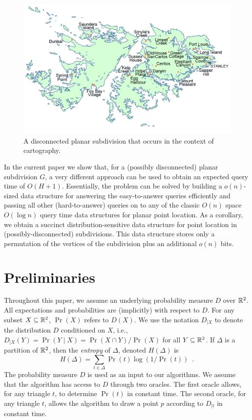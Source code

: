 \documentclass{patmorin}
\begin{document}
\begin{figure}
  \begin{center}\includegraphics[width=5in]{falklands}\end{center}
  \caption{A disconnected planar subdivision that occurs in the context of
cartography.}
\end{figure}

In the current paper we show that, for a (possibly disconnected)
planar subdivision $G$, a very different approach can be used to obtain
an expected query time of $O(H+1)$. Essentially, the problem can be
solved by building a $o(n)$-sized data structure for answering the
easy-to-answer queries efficiently and passing all other (hard-to-answer)
queries on to any of the classic $O(n)$ space $O(\log n)$ query time
data structures for planar point location. As a corollary, we obtain
a succinct distribution-sensitive data structure for point location in
(possibly-disconnected) subdivisions.  This data structure stores only
a permutation of the vertices of the subdivision plus an additional
$o(n)$ bits.

\section{Preliminaries}

Throughout this paper, we assume an underlying probability measure
$D$ over $\mathbb{R}^2$.  All expectations and probabilities are (implicitly)
with respect to $D$.  For any subset $X\subseteq\mathbb{R}^2$, $\Pr(X)$ refers
to $D(X)$.  We use the notation $D_{|X}$ to denote the distribution $D$
conditioned on $X$, i.e., $D_{|X}(Y)=\Pr(Y\mid X)=\Pr(X\cap Y)/\Pr(X)$
for all $Y\subseteq\mathbb{R}^2$.  If $\Delta$ is a partition of $\mathbb{R}^2$, then
the \emph{entropy} of $\Delta$, denoted $H(\Delta)$ is
\[
    H(\Delta) = \sum_{t\in \Delta} \Pr(t)\log(1/\Pr(t)) \enspace .
\]
The probability measure $D$ is used as an input to our algorithms.
We assume that the algorithm has access to $D$ through two oracles.
The first oracle allows, for any triangle $t$, to determine $\Pr(t)$
in constant time.  The second oracle, for any triangle $t$, allows the
algorithm to draw a point $p$ according to $D_{|t}$ in constant time.
\end{document}
